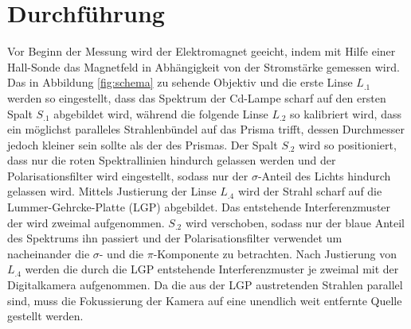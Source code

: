 
\section{Durchführung}
\label{sec:Durchführung}
Vor Beginn der Messung wird der Elektromagnet geeicht, indem mit Hilfe einer Hall-Sonde das Magnetfeld in Abhängigkeit von der Stromstärke gemessen wird. Das in Abbildung \ref{fig:schema} zu sehende Objektiv und die erste Linse $L_.1$ werden so eingestellt, dass das Spektrum der Cd-Lampe scharf auf den ersten Spalt $S_.1$ abgebildet wird, während die folgende Linse $L_.2$ so kalibriert wird, dass ein möglichst paralleles Strahlenbündel auf das Prisma trifft, dessen Durchmesser jedoch kleiner sein sollte als der des Prismas.
Der Spalt $S_.2$ wird so positioniert, dass nur die roten Spektrallinien hindurch gelassen werden und der Polarisationsfilter wird eingestellt, sodass nur der $\sigma$-Anteil des Lichts hindurch gelassen wird. Mittels Justierung der Linse $L_.4$ wird der Strahl scharf auf die Lummer-Gehrcke-Platte (LGP) abgebildet. Das entstehende Interferenzmuster der wird zweimal aufgenommen.
$S_.2$ wird verschoben, sodass nur der blaue Anteil des Spektrums ihn passiert und der Polarisationsfilter verwendet um nacheinander die $\sigma$- und die $\pi$-Komponente zu betrachten. Nach Justierung von $L_.4$ werden die durch die LGP entstehende Interferenzmuster je zweimal mit der Digitalkamera aufgenommen.
Da die aus der LGP austretenden Strahlen parallel sind, muss die Fokussierung der Kamera auf eine unendlich weit entfernte Quelle gestellt werden.
